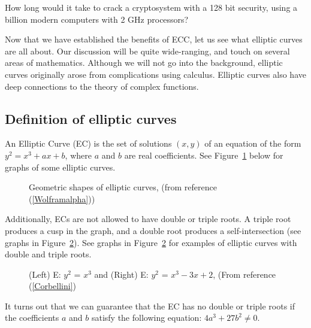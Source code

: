 \begin{exercise}{}
How long would it take to crack a cryptosystem with a 128 bit security, using a billion modern computers with 2 GHz processors?
\end{exercise}

Now that we have established the benefits of ECC, let us see what elliptic curves are all about. Our discussion will be quite wide-ranging, and touch on several areas of mathematics. Although we will not go into the background, elliptic curves originally arose from complications using calculus. Elliptic curves also have deep connections to the theory of complex functions. 

\subsection{Definition of elliptic curves}
An Elliptic Curve (EC) is the set of solutions $(x,y)$ of  an equation of the form $y^2 = x^3 + ax + b$, where $a$ and $b$ are real coefficients.  See Figure~\ref{fig:DH:DHKE_5} below for graphs of some elliptic  curves.  
\begin{figure}[htbp]
	  \caption{\label{fig:DH:DHKE_5}  Geometric shapes of elliptic curves, (from reference (\ref{Wolframalpha}))}
\end{figure}
Additionally, ECs are not allowed to have double or triple roots.  A triple root produces a cusp in the graph, and a double root produces a self-intersection (see graphs in Figure~\ref{fig:DH:DHKE_10}). See graphs in Figure~\ref{fig:DH:DHKE_10} for examples of elliptic curves with double and triple roots.
\begin{figure}[htbp]
	  \caption{\label{fig:DH:DHKE_10}(Left) E: $ y^2$ = $x^3$ and (Right) E: $ y^2$ = $x^3-3x+2$, (From reference (\ref{Corbellini})}
\end{figure}
 It turns out that we can guarantee that the EC has no double or triple roots if the coefficients $a$ and $b$ satisfy the following equation: $4a^3 + 27b^2 \neq 0$. 

